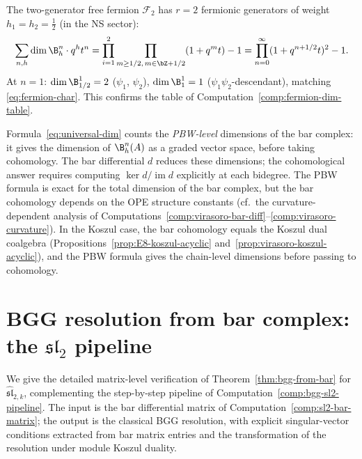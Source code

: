 \begin{computation}
\label{comp:verify-fermion}
The two-generator free fermion $\mathcal{F}_2$ has $r = 2$ fermionic
generators of weight $h_1 = h_2 = \tfrac{1}{2}$ (in the NS sector):
\[
\sum_{n,h} \dim \B^n_h \cdot q^h t^n
= \prod_{i=1}^{2} \prod_{m \geq 1/2,\, m \in \bZ + 1/2}
  (1 + q^m t) - 1
= \prod_{n=0}^{\infty} (1 + q^{n+1/2} t)^2 - 1.
\]
At $n = 1$: $\dim \B^1_{1/2} = 2$ ($\psi_1$, $\psi_2$),
$\dim \B^1_1 = 1$ ($\psi_1 \psi_2$-descendant), matching
\eqref{eq:fermion-char}.
This confirms the table of Computation~\ref{comp:fermion-dim-table}.
\end{computation}

\begin{remark}\label{rem:PBW-approximation}
Formula~\eqref{eq:universal-dim} counts the
\emph{PBW-level} dimensions of the bar complex: it gives
the dimension of $\B^n_h(A)$ as a graded vector space, before
taking cohomology.  The bar differential $d$ reduces these
dimensions; the cohomological answer requires computing
$\ker d / \operatorname{im} d$ explicitly at each bidegree.
The PBW formula is exact for the total dimension of the bar complex,
but the bar cohomology depends on the OPE structure constants
(cf.\ the curvature-dependent analysis of
Computations~\ref{comp:virasoro-bar-diff}--\ref{comp:virasoro-curvature}).
In the Koszul case, the bar cohomology equals the Koszul dual
coalgebra (Propositions~\ref{prop:E8-koszul-acyclic}
and~\ref{prop:virasoro-koszul-acyclic}), and the PBW formula gives
the chain-level dimensions before passing to cohomology.
\end{remark}


\section{BGG resolution from bar complex: the
\texorpdfstring{$\mathfrak{sl}_2$}{sl-2} pipeline}
\label{sec:bgg-sl2-pipeline}

We give the detailed matrix-level verification of
Theorem~\ref{thm:bgg-from-bar} for
$\widehat{\mathfrak{sl}}_{2,k}$, complementing the
step-by-step pipeline of
Computation~\ref{comp:bgg-sl2-pipeline}.  The input is
the bar differential matrix of
Computation~\ref{comp:sl2-bar-matrix}; the output is
the classical BGG resolution, with explicit singular-vector
conditions extracted from bar matrix entries and the
transformation of the resolution under module Koszul duality.

